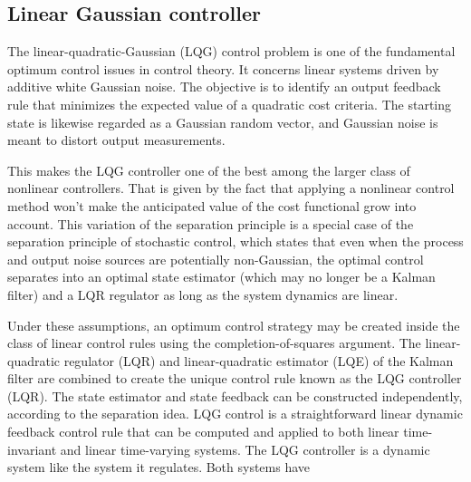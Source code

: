 \documentclass[conference]{IEEEtran}
\begin{document}
\subsection{Linear Gaussian controller}
\par
The linear-quadratic-Gaussian (LQG) control problem is one of the fundamental
optimum control issues in control theory. It concerns linear systems driven by
additive white Gaussian noise. The objective is to identify an output feedback
rule that minimizes the expected value of a quadratic cost criteria. The
starting state is likewise regarded as a Gaussian random vector, and Gaussian
noise is meant to distort output measurements.
\par
This makes the LQG controller one of the best among the larger class of
nonlinear controllers. That is given by the fact that applying a nonlinear
control method won't make the anticipated value of the cost functional grow
into account. This variation of the separation principle is a special case of
the separation principle of stochastic control, which states that even when the
process and output noise sources are potentially non-Gaussian, the optimal
control separates into an optimal state estimator (which may no longer be a
Kalman filter) and a LQR regulator as long as the system dynamics are linear.
\par
Under these assumptions, an optimum control strategy may be created inside the
class of linear control rules using the completion-of-squares argument. The
linear-quadratic regulator (LQR) and linear-quadratic estimator (LQE) of the
Kalman filter are combined to create the unique control rule known as the LQG
controller (LQR). The state estimator and state feedback can be constructed
independently, according to the separation idea. LQG control is a
straightforward linear dynamic feedback control rule that can be computed and
applied to both linear time-invariant and linear time-varying systems. The LQG
controller is a dynamic system like the system it regulates. Both systems have
\end{document}
